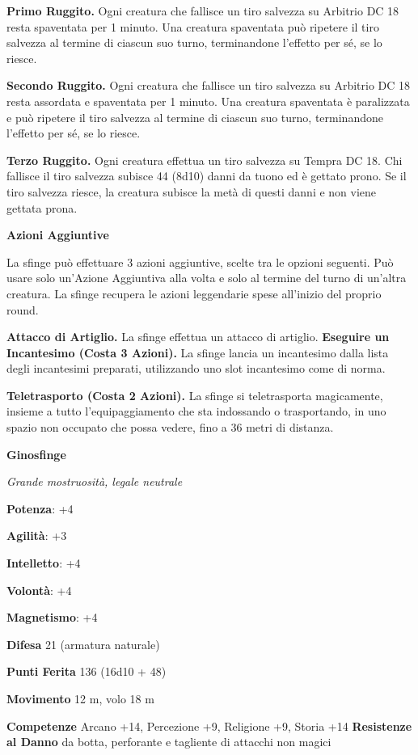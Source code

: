 \begin{multicols}{2}
\textbf{Primo Ruggito.} Ogni creatura che fallisce un tiro salvezza su Arbitrio DC 18 resta spaventata per 1 minuto. Una creatura spaventata
può ripetere il tiro salvezza al termine di ciascun suo turno,
terminandone l'effetto per sé, se lo riesce.

\textbf{Secondo Ruggito.} Ogni creatura che fallisce un tiro salvezza su Arbitrio DC 18 resta assordata e spaventata per 1 minuto. Una creatura
spaventata è paralizzata e può ripetere il tiro salvezza al termine di
ciascun suo turno, terminandone l'effetto per sé, se lo riesce.

\textbf{Terzo Ruggito.} Ogni creatura effettua un tiro salvezza su Tempra DC 18. Chi fallisce il tiro salvezza subisce 44 (8d10)
danni da tuono ed è gettato prono. Se il tiro salvezza riesce, la
creatura subisce la metà di questi danni e non viene gettata prona.

\textbf{Azioni Aggiuntive}

La sfinge può effettuare 3 azioni aggiuntive, scelte tra le opzioni
seguenti. Può usare solo un'Azione Aggiuntiva alla volta e solo al
termine del turno di un'altra creatura. La sfinge recupera le azioni
leggendarie spese all'inizio del proprio round.

\textbf{Attacco di Artiglio.} La sfinge effettua un attacco di artiglio.
\textbf{Eseguire un Incantesimo (Costa 3 Azioni).} La sfinge lancia un
incantesimo dalla lista degli incantesimi preparati, utilizzando uno
slot incantesimo come di norma.

\textbf{Teletrasporto (Costa 2 Azioni).} La sfinge si teletrasporta
magicamente, insieme a tutto l'equipaggiamento che sta indossando o
trasportando, in uno spazio non occupato che possa vedere, fino a 36
metri di distanza.


\textbf{Ginosfinge}

\emph{Grande mostruosità, legale neutrale}

\textbf{Potenza}: +4

\textbf{Agilità}: +3

\textbf{Intelletto}: +4

\textbf{Volontà}: +4

\textbf{Magnetismo}: +4

\textbf{Difesa} 21 (armatura naturale)

\textbf{Punti Ferita} 136 (16d10 + 48)

\textbf{Movimento} 12 m, volo 18 m

\textbf{Competenze} Arcano +14, Percezione +9, Religione +9, Storia +14
\textbf{Resistenze al Danno} da botta, perforante e tagliente di
attacchi non magici


\end{multicols}
